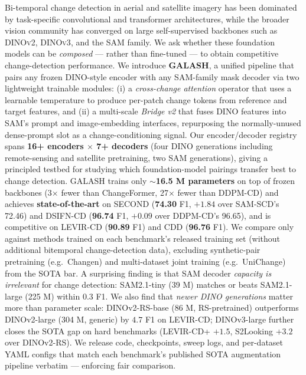 Bi-temporal change detection in aerial and satellite imagery has been dominated
by task-specific convolutional and transformer architectures, while the broader
vision community has converged on large self-supervised backbones such as
\textsc{DINOv2}, \textsc{DINOv3}, and the \textsc{SAM} family. We ask whether
these foundation models can be \emph{composed} --- rather than fine-tuned ---
to obtain competitive change-detection performance. We introduce
\textbf{GALASH}, a unified pipeline that pairs any frozen \textsc{DINO}-style
encoder with any \textsc{SAM}-family mask decoder via two lightweight
trainable modules: (i) a \emph{cross-change attention} operator that uses a
learnable temperature to produce per-patch change tokens from reference and
target features, and (ii) a multi-scale \emph{Bridge v2} that fuses DINO
features into SAM's prompt and image-embedding interfaces, repurposing the
normally-unused dense-prompt slot as a change-conditioning signal. Our
encoder/decoder registry spans \textbf{16+ encoders $\times$ 7+ decoders}
(four \textsc{DINO} generations including remote-sensing and satellite
pretraining, two \textsc{SAM} generations), giving a principled testbed for
studying which foundation-model pairings transfer best to change detection.
GALASH trains only $\sim$\textbf{16.5 M parameters} on top of frozen
backbones (3$\times$ fewer than ChangeFormer, 27$\times$ fewer than DDPM-CD)
and achieves \textbf{state-of-the-art} on
SECOND (\textbf{74.30} F1, $+1.84$ over SAM-SCD's 72.46) and DSIFN-CD
(\textbf{96.74} F1, $+0.09$ over DDPM-CD's 96.65), and is competitive on
LEVIR-CD (\textbf{90.89} F1) and CDD (\textbf{96.76} F1).
We compare only against methods trained on each benchmark's released training
set (without additional bitemporal change-detection data), excluding
synthetic-pair pretraining (e.g.\ Changen) and multi-dataset joint training
(e.g.\ UniChange) from the SOTA bar. A surprising finding
is that SAM decoder \emph{capacity is irrelevant} for change detection:
SAM2.1-tiny (39 M) matches or beats SAM2.1-large (225 M) within $0.3$ F1.
We also find that \emph{newer DINO generations} matter more than parameter
scale: DINOv2-RS-base (86 M, RS-pretrained) outperforms DINOv2-large (304 M,
generic) by $4.7$ F1 on LEVIR-CD; DINOv3-large further closes the SOTA gap
on hard benchmarks (LEVIR-CD+ $+1.5$, S2Looking $+3.2$ over DINOv2-RS).
We release code, checkpoints, sweep logs, and per-dataset YAML configs that
match each benchmark's published SOTA augmentation pipeline verbatim ---
enforcing fair comparison.
